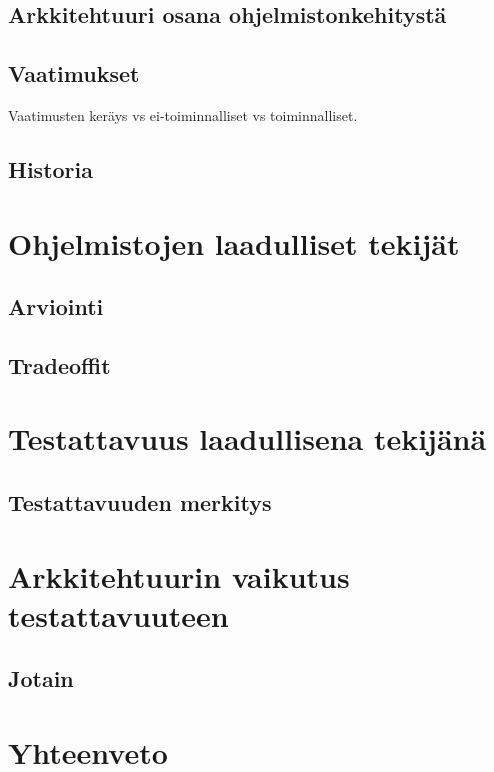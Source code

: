 \documentclass[finnish]{tktltiki2}
\theoremstyle{definition}
\theoremstyle{remark}
\begin{document}

\subsection{Arkkitehtuuri osana ohjelmistonkehitystä}


\subsection{Vaatimukset}
Vaatimusten keräys vs ei-toiminnalliset vs toiminnalliset.



\subsection{Historia}


\section{Ohjelmistojen laadulliset tekijät}
\subsection{Arviointi}
\subsection{Tradeoffit}

\section{Testattavuus laadullisena tekijänä}
\subsection{Testattavuuden merkitys}

\section{Arkkitehtuurin vaikutus testattavuuteen}
\subsection{Jotain}


\section{Yhteenveto}
\end{document}
